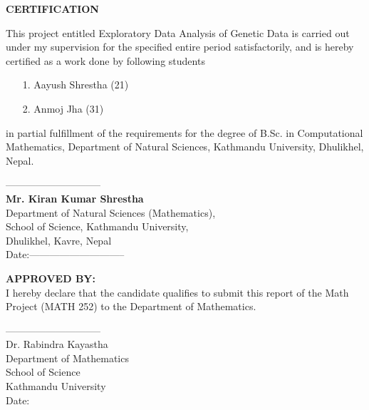 



\begin{center}
	{\Large{\bf{ CERTIFICATION}}}
\end{center}


\noindent
This project entitled Exploratory Data Analysis of Genetic Data is carried out  under my supervision for the specified entire period satisfactorily, and is hereby certified as a work done by following students
\begin{itemize}
\item[1.] Aayush Shrestha (21)
\item[2.] Anmoj Jha (31)
\end{itemize}
 in partial fulfillment of the requirements for the degree of B.Sc. in Computational Mathematics, Department of Natural Sciences, Kathmandu University, Dhulikhel, Nepal.

\vspace{2.0cm}

\noindent
-----------------------------\\
{\bf Mr. Kiran Kumar Shrestha}\\
Department of Natural Sciences (Mathematics),\\
School of Science, Kathmandu University,\\
Dhulikhel, Kavre, Nepal\\
Date:-----------------------------\\

\vspace{2cm}

\noindent
{\bf APPROVED BY:}\\
I hereby declare that the candidate qualifies to submit this  report of the  Math Project (MATH 252) to the Department of Mathematics. 



\vspace{2cm}

\noindent
-----------------------------\\
Dr. Rabindra Kayastha\\
Department of Mathematics\\
School of Science\\
Kathmandu University\\
Date:\\  